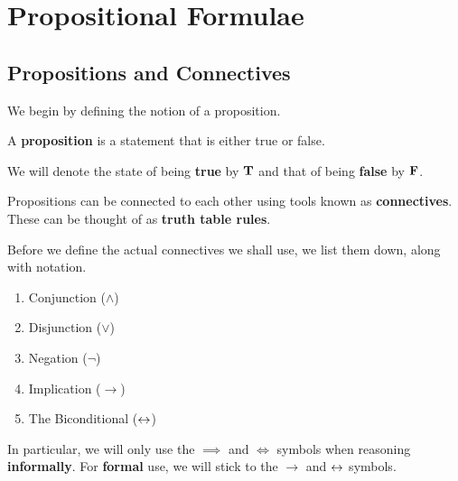 \section{Propositional Formulae}

\subsection{Propositions and Connectives}

We begin by defining the notion of a proposition.

\begin{boxdefinition}[Proposition]
    A \textbf{proposition} is a statement that is either true or false.
\end{boxdefinition}

\begin{boxconvention}
    We will denote the state of being \textbf{true} by $\mathbf{T}$ and that of being \textbf{false} by $\mathbf{F}$.
\end{boxconvention}

Propositions can be connected to each other using tools known as \textbf{connectives}. These can be thought of as \textbf{truth table rules}.

\begin{boxconvention}
    Before we define the actual connectives we shall use, we list them down, along with notation.
    \begin{enumerate}[noitemsep]
        \item Conjunction ($\land$)
        \item Disjunction ($\lor$)
        \item Negation ($\neg$)
        \item Implication ($\to$)
        \item The Biconditional ($\leftrightarrow$)
    \end{enumerate}
    In particular, we will only use the $\implies$ and $\iff$ symbols when reasoning \textbf{informally}. For \textbf{formal} use, we will stick to the $\to$ and $\leftrightarrow$ symbols.
\end{boxconvention}

